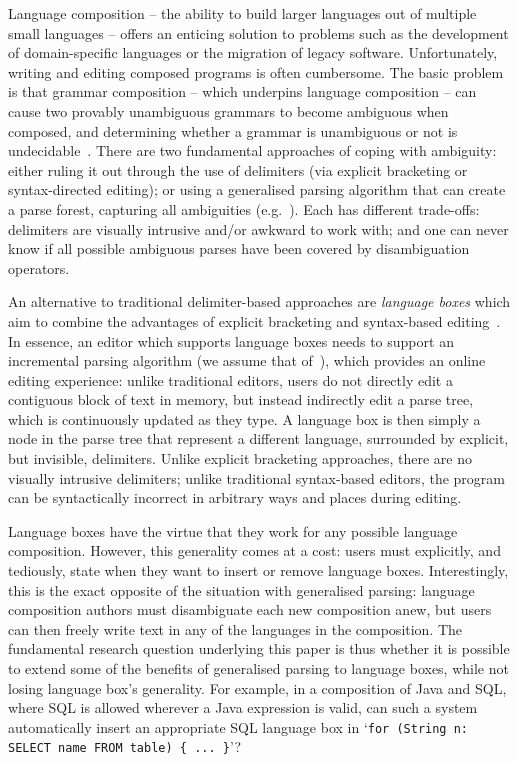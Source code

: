 \documentclass[sigplan,screen]{acmart}\settopmatter{printfolios=true,printccs=false,printacmref=false}
\begin{document}
Language composition -- the ability to build larger languages out of multiple
small languages -- offers an enticing solution to problems such as the
development of domain-specific languages or the migration of legacy software.
Unfortunately, writing and editing composed programs is often cumbersome.
The basic problem is that grammar
composition -- which underpins language composition -- can cause
two provably unambiguous grammars to become ambiguous when composed,
and determining whether a grammar is unambiguous or not is
undecidable~\cite{cantor62ambiguity}. There are two fundamental approaches
of coping with ambiguity: either ruling it out through the use of
delimiters (via explicit bracketing or syntax-directed
editing); or using a generalised parsing algorithm that can create a parse
forest, capturing all ambiguities
(e.g.~\cite{visser97scannerless}). Each has different trade-offs: delimiters
are visually intrusive and/or awkward to work with; and one can never know if all possible
ambiguous parses have been covered by disambiguation operators.

An alternative to traditional delimiter-based approaches are \emph{language boxes} which aim to
combine the advantages of explicit bracketing and syntax-based
editing~\cite{diekmann14eco}. In essence, an editor
which supports language boxes needs to support an incremental parsing algorithm
(we assume that of~\citet{wagner98practicalalgorithms}), which provides an
online editing experience: unlike traditional editors, users do not directly edit
a contiguous block of text in memory, but instead
indirectly edit a parse tree, which is continuously updated as they type.
A language box is then simply a node in the parse
tree that represent a different language, surrounded by
explicit, but invisible, delimiters. Unlike explicit bracketing approaches,
there are no visually intrusive delimiters; unlike traditional
syntax-based editors, the program can be syntactically incorrect in arbitrary
ways and places during editing.

Language boxes have the virtue that they work for any possible
language composition. However, this generality comes at a cost:
users must explicitly, and tediously, state when they want
to insert or remove language boxes. Interestingly, this is the exact
opposite of the situation with generalised parsing: language composition
authors must disambiguate each new composition anew, but users can then
freely write text in any of the languages in the composition.
The fundamental research question underlying this paper is thus whether it is
possible to extend some of the benefits of generalised parsing to language
boxes, while not losing language box's generality.
For example, in a composition of Java and SQL, where SQL is allowed
wherever a Java expression is valid, can such a system automatically insert an
appropriate SQL language box in `\texttt{for (String n: SELECT name FROM table) \{ ...
\}}'?
\end{document}
